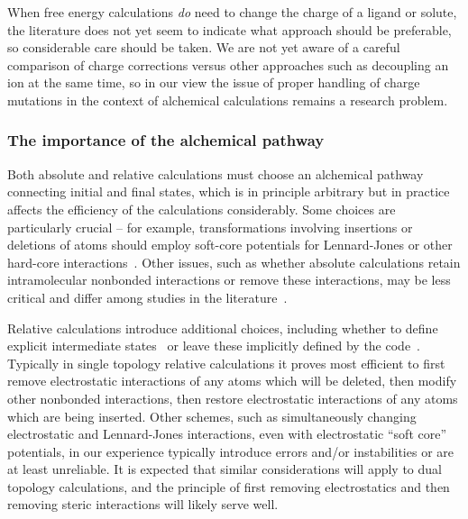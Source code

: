 \documentclass[9pt,bestpractices]{livecoms}
\begin{document}
When free energy calculations \emph{do} need to change the charge of a ligand or solute, the literature does not yet seem to indicate what approach should be preferable, so considerable care should be taken.
We are not yet aware of a careful comparison of charge corrections versus other approaches such as decoupling an ion at the same time, so in our view the issue of proper handling of charge mutations in the context of alchemical calculations remains a research problem.

\subsubsection*{The importance of the alchemical pathway\label{sec:important_path}}


Both absolute and relative calculations must choose an alchemical pathway connecting initial and final states, which is in principle arbitrary but in practice affects the efficiency of the calculations considerably.
Some choices are particularly crucial -- for example, transformations involving insertions or deletions of atoms should employ soft-core potentials for Lennard-Jones or other hard-core interactions~\cite{}.
Other issues, such as whether absolute calculations retain intramolecular nonbonded interactions or remove these interactions, may be less critical and differ among studies in the literature~\cite{}.

Relative calculations introduce additional choices, including whether to define explicit intermediate states~\cite{} or leave these implicitly defined by the code~\cite{}.
Typically in single topology relative calculations it proves most efficient to first remove electrostatic interactions of any atoms which will be deleted, then modify other nonbonded interactions, then restore electrostatic interactions of any atoms which are being inserted.
Other schemes, such as simultaneously changing electrostatic and Lennard-Jones interactions, even with electrostatic ``soft core'' potentials, in our experience typically introduce errors and/or instabilities or are at least unreliable.
It is expected that similar considerations will apply to dual topology calculations, and the principle of first removing electrostatics and then removing steric interactions will likely serve well.
\end{document}
